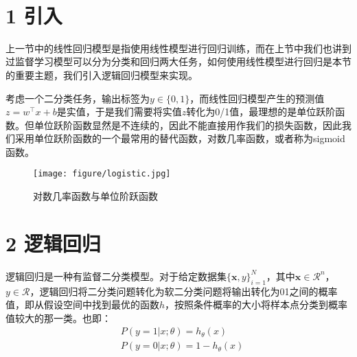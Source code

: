 \documentclass[twoside]{article}
\begin{document}
\clearpage
	 \vspace{2mm} \\
\section*{1 引入}
上一节中的线性回归模型是指使用线性模型进行回归训练，而在上节中我们也讲到过监督学习模型可以分为分类和回归两大任务，如何使用线性模型进行回归是本节的重要主题，我们引入逻辑回归模型来实现。


考虑一个二分类任务，输出标签为$y\in \{0,1\}$，而线性回归模型产生的预测值$z=w^\top x +b$是实值，于是我们需要将实值$z$转化为0/1值，最理想的是单位跃阶函数。但单位跃阶函数显然是不连续的，因此不能直接用作我们的损失函数，因此我们采用单位跃阶函数的一个最常用的替代函数，对数几率函数，或者称为sigmoid函数。
\begin{figure}[h]
    \centering
    \texttt{[image: figure/logistic.jpg]}
    \caption{对数几率函数与单位阶跃函数}
\end{figure}

\section*{2 逻辑回归}
逻辑回归是一种有监督二分类模型。对于给定数据集$\{\boldsymbol{x},y\}_{i=1}^N$，其中$\boldsymbol{x} \in \mathcal{R}^{n}$，$y \in \mathcal{R}$，逻辑回归将二分类问题转化为软二分类问题将输出转化为01之间的概率值，即从假设空间中找到最优的函数$h$，按照条件概率的大小将样本点分类到概率值较大的那一类。也即：
\begin{equation*}
    \begin{aligned}
        &P(y=1|x;\theta)=h_{\theta}(x)\\
        &P(y=0|x;\theta)=1-h_{\theta}(x)
    \end{aligned}
\end{equation*}
\end{document}
